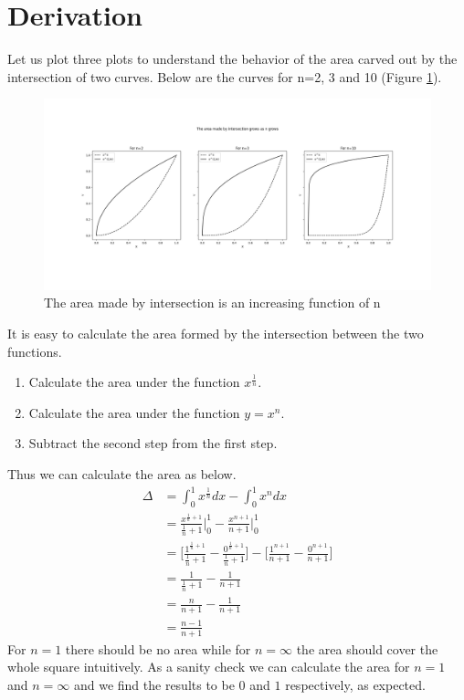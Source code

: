 \documentclass[10pt, twoside]{article}
\begin{document}
\section{Derivation}
Let us plot three plots to understand the behavior of the area carved out by the intersection of two curves. Below are the curves for n=2, 3 and 10 (Figure \ref{Area_2_3_10}). 
\begin{figure}[h!]
\includegraphics[width=\linewidth]{All_Three_Plots.png}
\caption{The area made by intersection is an increasing function of n}
\label{Area_2_3_10}
\end{figure}
It is easy to calculate the area formed by the intersection between the two functions.
\begin{enumerate}
\item Calculate the area under the function $x^{\frac{1}{n}}$.
\item Calculate the area under the function $y=x^n$.
\item Subtract the second step from the first step.
\end{enumerate}
Thus we can calculate the area as below.
\begin{align*}
 \Delta &= \int_{0}^{1}x^{\frac{1}{n}}dx - \int_{0}^{1}x^{n}dx \\
 &= \frac{x^{\frac{1}{n}+1}}{\frac{1}{n}+1} \Big|_0^1 - \frac{x^{n+1}}{n+1} \Big|_0^1 \\
 &= \Big[\frac{1^{\frac{1}{n}+1}}{\frac{1}{n}+1} - \frac{0^{\frac{1}{n}+1}}{\frac{1}{n}+1}\Big] - \Big[\frac{1^{n+1}}{n+1} - \frac{0^{n+1}}{n+1} \Big] \\
 &= \frac{1}{\frac{1}{n}+1} - \frac{1}{n+1}\\
 &= \frac{n}{n+1} - \frac{1}{n+1} \\
 &= \frac{n-1}{n+1}
\end{align*}
For $n=1$ there should be no area while for $n=\infty$ the area should cover the whole square intuitively. As a sanity check we can calculate the area for $n=1$ and $n=\infty$ and we find the results to be $0$ and $1$ respectively, as expected. 
\end{document}
